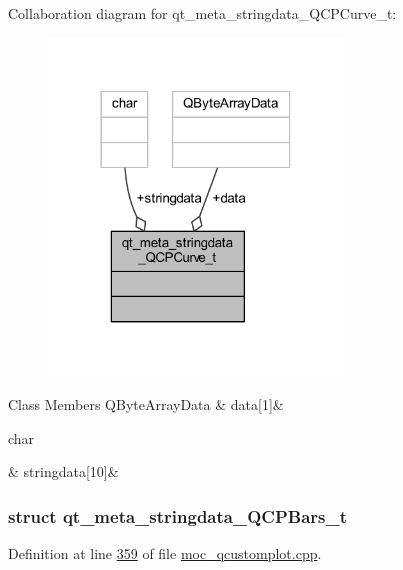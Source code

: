 Collaboration diagram for qt\+\_\+meta\+\_\+stringdata\+\_\+\+Q\+C\+P\+Curve\+\_\+t\+:
\nopagebreak
\begin{figure}[H]
\begin{center}
\leavevmode
\includegraphics[width=222pt]{de/d53/a00169}
\end{center}
\end{figure}
\begin{DoxyFields}{Class Members}
\hypertarget{a00016_ac2243b1095d588f9864242ffc67f432f}{Q\+Byte\+Array\+Data}\label{a00016_ac2243b1095d588f9864242ffc67f432f}
&
data\mbox{[}1\mbox{]}&
\\
\hline

\hypertarget{a00016_ad141d5092cc25ae43c6c60a782ca04ee}{char}\label{a00016_ad141d5092cc25ae43c6c60a782ca04ee}
&
stringdata\mbox{[}10\mbox{]}&
\\
\hline

\end{DoxyFields}
\label{d4/d3a/a00101}
\hypertarget{a00016_d4/d3a/a00101}{}
\subsubsection{struct qt\+\_\+meta\+\_\+stringdata\+\_\+\+Q\+C\+P\+Bars\+\_\+t}


Definition at line \hyperlink{a00016_source_l00359}{359} of file \hyperlink{a00016_source}{moc\+\_\+qcustomplot.\+cpp}.



